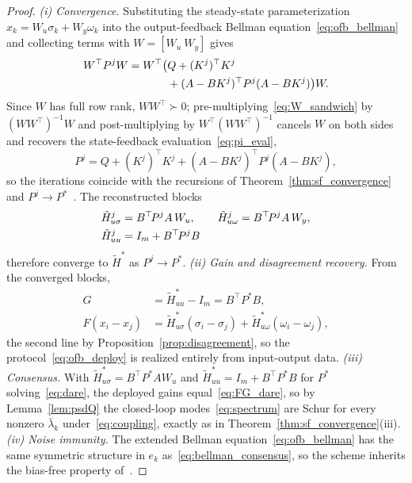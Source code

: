 \documentclass[final,5p,times]{elsarticle}
\theoremstyle{plain}
\theoremstyle{definition}
\theoremstyle{remark}
\begin{document}
\begin{proof}
\emph{(i) Convergence.} Substituting the steady-state parameterization $x_k = W_u\sigma_k + W_y\omega_k$ into the output-feedback Bellman equation~\eqref{eq:ofb_bellman} and collecting terms with $W = [W_u\ W_y]$ gives
\begin{align}
W^\top P^j W = W^\top\big(&Q + (K^j)^\top K^j \notag\\
&+ (A - BK^j)^\top P^j (A - BK^j)\big) W.
\label{eq:W_sandwich}
\end{align}
Since $W$ has full row rank, $WW^\top \succ 0$; pre-multiplying~\eqref{eq:W_sandwich} by $(WW^\top)^{-1}W$ and post-multiplying by $W^\top(WW^\top)^{-1}$ cancels $W$ on both sides and recovers the state-feedback evaluation~\eqref{eq:pi_eval},
\begin{equation}
P^j = Q + (K^j)^\top K^j + (A - BK^j)^\top P^j (A - BK^j),
\end{equation}
so the iterations coincide with the recursions of Theorem~\ref{thm:sf_convergence} and $P^j \to P^*$~\cite[Thms.~2.6, 2.7]{rizvi2022}. The reconstructed blocks
\begin{align}
\tilde{H}_{u\sigma}^j &= B^\top\! P^j A\, W_u, \qquad
\tilde{H}_{u\omega}^j = B^\top\! P^j A\, W_y, \notag\\
\tilde{H}_{uu}^j &= I_m + B^\top\! P^j B
\end{align}
therefore converge to $\tilde{H}^*$ as $P^j \to P^*$.
\emph{(ii) Gain and disagreement recovery.} From the converged blocks,
\begin{align}
G &= \tilde{H}_{uu}^* - I_m = B^\top\! P^* B,\\
F(x_i - x_j) &= \tilde{H}_{u\sigma}^*(\sigma_i - \sigma_j) + \tilde{H}_{u\omega}^*(\omega_i - \omega_j),
\end{align}
the second line by Proposition~\ref{prop:disagreement}, so the protocol~\eqref{eq:ofb_deploy} is realized entirely from input-output data.
\emph{(iii) Consensus.} With $\tilde{H}_{u\sigma}^* = B^\top P^* A W_u$ and $\tilde{H}_{uu}^* = I_m + B^\top P^* B$ for $P^*$ solving~\eqref{eq:dare}, the deployed gains equal~\eqref{eq:FG_dare}, so by Lemma~\ref{lem:psdQ} the closed-loop modes~\eqref{eq:spectrum} are Schur for every nonzero $\bar{\lambda}_k$ under~\eqref{eq:coupling}, exactly as in Theorem~\ref{thm:sf_convergence}(iii).
\emph{(iv) Noise immunity.} The extended Bellman equation~\eqref{eq:ofb_bellman} has the same symmetric structure in $e_k$ as~\eqref{eq:bellman_consensus}, so the scheme inherits the bias-free property of~\cite[Thm.~2.8]{rizvi2022}.
\end{proof}
\end{document}
